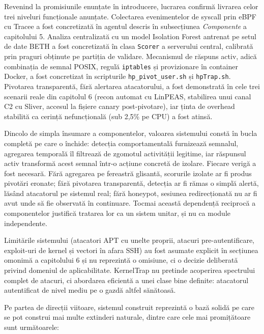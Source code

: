 \documentclass[12pt, a4paper]{report}
\begin{document}
Revenind la promisiunile enunțate în introducere, lucrarea confirmă livrarea
celor trei niveluri funcționale anunțate. Colectarea evenimentelor de syscall
prin eBPF cu Tracee a fost concretizată în agentul descris în subsecțiunea
\textit{Componente} a capitolului 5. Analiza centralizată cu un model Isolation
Forest antrenat pe setul de date BETH a fost concretizată în clasa
\texttt{Scorer} a serverului central, calibrată prin praguri obținute pe partiția
de validare. Mecanismul de răspuns activ, adică combinația de semnal POSIX, regulă
\texttt{iptables} și provizionare în container Docker, a fost concretizat în
scripturile \texttt{hp\_pivot\_user.sh} și \texttt{hpTrap.sh}. Pivotarea
transparentă, fără alertarea atacatorului, a fost demonstrată în cele trei
scenarii reale din capitolul 6 (recon automat cu LinPEAS, stabilirea unui
canal C2 cu Sliver, accesul la fișiere canary post-pivotare), iar ținta de
overhead stabilită ca cerință nefuncțională (sub 2,5\% pe CPU) a fost atinsă.

Dincolo de simpla însumare a componentelor, valoarea sistemului constă în bucla
completă pe care o închide: detecția comportamentală furnizează semnalul,
agregarea temporală îl filtrează de zgomotul activității legitime, iar răspunsul
activ transformă acest semnal într-o acțiune concretă de izolare. Fiecare verigă
a fost necesară. Fără agregarea pe fereastră glisantă, scorurile izolate ar fi
produs pivotări eronate; fără pivotarea transparentă, detecția ar fi rămas o
simplă alertă, lăsând atacatorul pe sistemul real; fără honeypot, sesiunea
redirecționată nu ar fi avut unde să fie observată în continuare. Tocmai această
dependență reciprocă a componentelor justifică tratarea lor ca un sistem unitar,
și nu ca module independente.

Limitările sistemului (atacatori APT cu unelte proprii, atacuri
pre-autentificare, exploit-uri de kernel și vectori în afara SSH) au fost
asumate explicit în secțiunea omonimă a capitolului 6 și nu reprezintă o
omisiune, ci o decizie deliberată privind domeniul de aplicabilitate. KernelTrap
nu pretinde acoperirea spectrului complet de atacuri, ci abordarea eficientă
a unei clase bine definite: atacatorul autentificat de nivel mediu pe o gazdă
altfel sănătoasă.

Pe partea de direcții viitoare, sistemul construit reprezintă o bază solidă
pe care se pot construi mai multe extinderi naturale, dintre care cele mai
promițătoare sunt următoarele:
\end{document}
